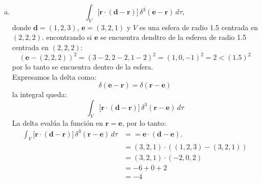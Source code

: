 \documentclass[12pt]{article}
\begin{document}
\begin{enumerate}[(a)]
    \item 
    \[
    \int_V \bigl[\mathbf{r} \cdot (\mathbf{d} - \mathbf{r})\bigr]\,
    \delta^3(\mathbf{e} - \mathbf{r}) \, d\tau,
    \]
    donde \(\mathbf{d} = (1,2,3)\), \(\mathbf{e} = (3,2,1)\) y \(V\) es una esfera de radio 1.5 centrada en \((2,2,2)\).
    encontrando si \(\mathbf{e} \) se encuentra dendtro de la esferea de radio 1.5 centrada en \((2,2,2)\):
    \[(\mathbf{e} - (2,2,2))^2 = (3-2,2-2,1-2)^2 = (1,0,-1)^2 = 2 <(1.5)^2\]
    por lo tanto se encuentra dentro de la esfera.\\
    Expresamos la delta como:
    \[ \delta(\mathbf{e} - \mathbf{r} )= \delta(\mathbf{r} - \mathbf{e} ) \]
    la integral queda:
    \[
    \int_V \bigl[\mathbf{r} \cdot (\mathbf{d} - \mathbf{r})\bigr]\,
    \delta^3(\mathbf{r} - \mathbf{e}) \, d\tau
    \]
    La delta evalúa la función en \(\mathbf{r} = \mathbf{e}\), por lo tanto:
    \begin{align*}
        \int_V \bigl[\mathbf{r} \cdot (\mathbf{d} - \mathbf{r})\bigr]\,
        \delta^3(\mathbf{r} - \mathbf{e}) \, d\tau& = = \mathbf{e} \cdot (\mathbf{d} - \mathbf{e}).\\
& = (3,2,1)\cdot((1,2,3)-(3,2,1))\\ 
& = (3,2,1)\cdot(-2,0,2)\\
& = -6+0+2\\
& = \boxed{-4}
    \end{align*}
    
    \end{enumerate}
\end{document}
